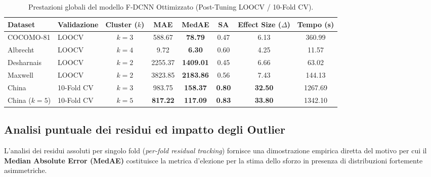 \documentclass[11pt, a4paper]{article}
\begin{document}
\begin{table}[htbp]
    \centering
    \caption{Prestazioni globali del modello F-DCNN Ottimizzato (Post-Tuning LOOCV / 10-Fold CV).}\label{tab:final_benchmark}
    \small
    \begin{tabular}{llcccccc}
        \toprule
        \rowcolor{tableheader} \textbf{Dataset} & \textbf{Validazione} & \textbf{Cluster ($k$)} & \textbf{MAE}    & \textbf{MedAE}   & \textbf{SA}   & \textbf{Effect Size ($\Delta$)} & \textbf{Tempo (s)} \\
        \midrule
        COCOMO-81                               & LOOCV                & $k=3$                  & 588.67          & \textbf{78.79}   & 0.47          & 6.13                            & 360.99             \\
        \rowcolor{lightbg} Albrecht             & LOOCV                & $k=4$                  & 9.72            & \textbf{6.30}    & 0.60          & 4.25                            & 11.57              \\
        Desharnais                              & LOOCV                & $k=2$                  & 2255.37         & \textbf{1409.01} & 0.45          & 6.66                            & 63.02              \\
        \rowcolor{lightbg} Maxwell              & LOOCV                & $k=2$                  & 3823.85         & \textbf{2183.86} & 0.56          & 7.43                            & 144.13             \\
        China                                   & 10-Fold CV           & $k=3$                  & 983.75          & \textbf{158.37}  & \textbf{0.80} & \textbf{32.50}                  & 1267.69            \\
        \rowcolor{lightbg} China ($k=5$)        & 10-Fold CV           & $k=5$                  & \textbf{817.22} & \textbf{117.09}  & \textbf{0.83} & \textbf{33.80}                  & 1342.10            \\
        \bottomrule
    \end{tabular}
\end{table}

\subsection{Analisi puntuale dei residui ed impatto degli Outlier}
L'analisi dei residui assoluti per singolo fold (\textit{per-fold residual
    tracking}) fornisce una dimostrazione empirica diretta del motivo per cui il
\textbf{Median Absolute Error (MedAE)} costituisce la metrica d'elezione per la
stima dello sforzo in presenza di distribuzioni fortemente asimmetriche.
\end{document}
